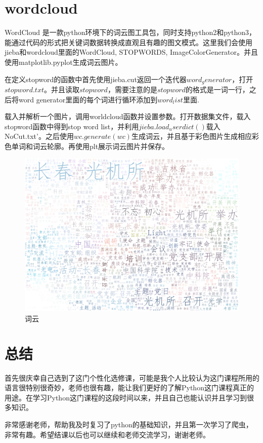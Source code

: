 \documentclass[12pt]{article}
\begin{document}
	\section{wordcloud}
	WordCloud 是一款python环境下的词云图工具包，同时支持python2和python3，能通过代码的形式把关键词数据转换成直观且有趣的图文模式。这里我们会使用jieba和wordcloud里面的WordCloud, STOPWORDS, ImageColorGenerator。并且使用matplotlib.pyplot生成词云图片。
	
	在定义stopword的函数中首先使用jieba.cut返回一个迭代器$word_generator$，打开$stop word.txt$。并且读取$stopword$，需要注意的是$stop word$的格式是一词一行，之后将word generator里面的每个词进行循环添加到$word_list$里面.
	
	载入并解析一个图片，调用worldcloud函数并设置参数。打开数据集文件，载入stopword函数中得到stop word list，并利用$jieba.load_userdict()$载入NoCut.txt'。之后使用$wc.generate(wc)$生成词云，并且基于彩色图片生成相应彩色单词和词云轮廓。再使用plt展示词云图片并保存。
	
	\begin{figure}[htb]
		\centering
		\includegraphics[scale=0.3]{WordCloud.png}
		\caption{词云}
	\end{figure}

	\section{总结}
	首先很庆幸自己选到了这门个性化选修课，可能是我个人比较认为这门课程所用的语言很特别很奇妙，老师也很有趣，能让我们更好的了解Python这门课程真正的用途。在学习Python这门课程的这段时间以来，并且自己也能认识并且学习到很多知识。
	
	非常感谢老师，帮助我及时复习了python的基础知识，并且第一次学习了爬虫，非常有趣。希望结课以后也可以继续和老师交流学习，谢谢老师。
\end{document}
